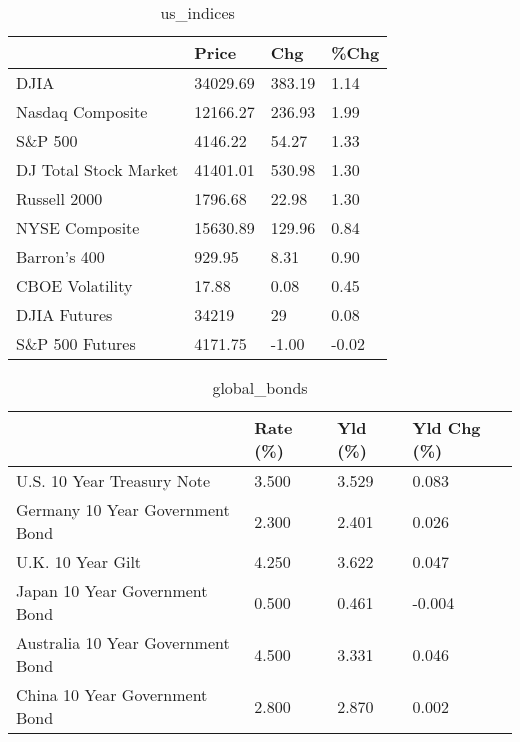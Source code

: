 \documentclass{article}%
\begin{document}
%


\begin{table}[htbp]%
\caption{us\_indices}%
\centering%
\begin{adjustbox}{width=1\textwidth}%
\begin{tabular}{llll}
\toprule
                      &    Price &    Chg &  \%Chg \\
\midrule
                 DJIA & 34029.69 & 383.19 &  1.14 \\
     Nasdaq Composite & 12166.27 & 236.93 &  1.99 \\
              S\&P 500 &  4146.22 &  54.27 &  1.33 \\
DJ Total Stock Market & 41401.01 & 530.98 &  1.30 \\
         Russell 2000 &  1796.68 &  22.98 &  1.30 \\
       NYSE Composite & 15630.89 & 129.96 &  0.84 \\
         Barron's 400 &   929.95 &   8.31 &  0.90 \\
      CBOE Volatility &    17.88 &   0.08 &  0.45 \\
         DJIA Futures &    34219 &     29 &  0.08 \\
      S\&P 500 Futures &  4171.75 &  -1.00 & -0.02 \\
\bottomrule
\end{tabular}
%
\end{adjustbox}%
\end{table}

%


\begin{table}[htbp]%
\caption{global\_bonds}%
\centering%
\begin{adjustbox}{width=1\textwidth}%
\begin{tabular}{llll}
\toprule
                                  & Rate (\%) & Yld (\%) & Yld Chg (\%) \\
\midrule
       U.S. 10 Year Treasury Note &    3.500 &   3.529 &       0.083 \\
  Germany 10 Year Government Bond &    2.300 &   2.401 &       0.026 \\
                U.K. 10 Year Gilt &    4.250 &   3.622 &       0.047 \\
    Japan 10 Year Government Bond &    0.500 &   0.461 &      -0.004 \\
Australia 10 Year Government Bond &    4.500 &   3.331 &       0.046 \\
    China 10 Year Government Bond &    2.800 &   2.870 &       0.002 \\
\bottomrule
\end{tabular}
%
\end{adjustbox}%
\end{table}
\end{document}
